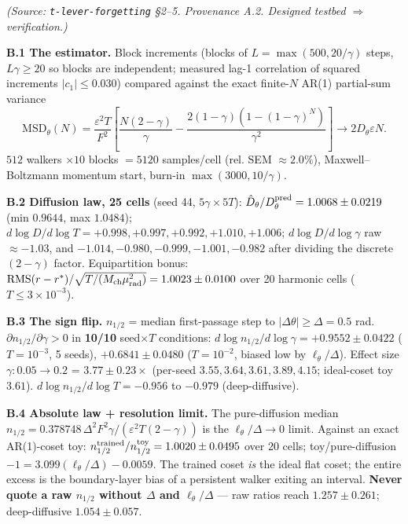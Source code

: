 \documentclass{article}
\begin{document}
\emph{(Source: \texttt{t-lever-forgetting} \S 2--5. Provenance A.2. Designed testbed $\Rightarrow$ verification.)}

\textbf{B.1 The estimator.} Block increments (blocks of $L=\max(500,20/\gamma)$ steps, $L\gamma\ge20$ so blocks are independent; measured lag-1 correlation of squared increments $|c_1|\le0.030$) compared against the exact finite-$N$ AR(1) partial-sum variance
\begin{equation*}
\mathrm{MSD}_\theta(N)=\frac{\varepsilon^2T}{F^2}\!\left[\frac{N(2-\gamma)}{\gamma}-\frac{2(1-\gamma)(1-(1-\gamma)^N)}{\gamma^2}\right]\to 2D_\theta\varepsilon N.
\end{equation*}
$512$ walkers $\times10$ blocks $=5120$ samples/cell (rel. SEM $\approx2.0\%$), Maxwell--Boltzmann momentum start, burn-in $\max(3000,10/\gamma)$.

\textbf{B.2 Diffusion law, 25 cells} (seed 44, $5\gamma\times5T$): $\hat D_\theta/D_\theta^{\rm pred}=1.0068\pm0.0219$ (min $0.9644$, max $1.0484$); $d\log D/d\log T=+0.998,+0.997,+0.992,+1.010,+1.006$; $d\log D/d\log\gamma$ raw $\approx-1.03$, and $-1.014,-0.980,-0.999,-1.001,-0.982$ after dividing the discrete $(2-\gamma)$ factor. Equipartition bonus: $\mathrm{RMS}(r-r^*)/\sqrt{T/(M_{\rm ch}\mu_{\rm rad}^2)}=1.0023\pm0.0100$ over 20 harmonic cells ($T\le3\times10^{-3}$).

\textbf{B.3 The sign flip.} $n_{1/2}$ = median first-passage step to $|\Delta\theta|\ge\Delta=0.5$ rad. $\partial n_{1/2}/\partial\gamma>0$ in \textbf{10/10} seed$\times T$ conditions: $d\log n_{1/2}/d\log\gamma=+0.9552\pm0.0422$ ($T=10^{-3}$, 5 seeds), $+0.6841\pm0.0480$ ($T=10^{-2}$, biased low by $\ell_\theta/\Delta$). Effect size $\gamma:0.05\to0.2$ = $3.77\pm0.23\times$ (per-seed $3.55,3.64,3.61,3.89,4.15$; ideal-coset toy $3.61$). $d\log n_{1/2}/d\log T=-0.956$ to $-0.979$ (deep-diffusive).

\textbf{B.4 Absolute law + resolution limit.} The pure-diffusion median $n_{1/2}=0.378748\,\Delta^2F^2\gamma/(\varepsilon^2T(2-\gamma))$ is the $\ell_\theta/\Delta\to0$ limit. Against an exact AR(1)-coset toy: $n_{1/2}^{\rm trained}/n_{1/2}^{\rm toy}=1.0020\pm0.0495$ over 20 cells; toy/pure-diffusion $-1=3.099(\ell_\theta/\Delta)-0.0059$. The trained coset \emph{is} the ideal flat coset; the entire excess is the boundary-layer bias of a persistent walker exiting an interval. \textbf{Never quote a raw $n_{1/2}$ without $\Delta$ and $\ell_\theta/\Delta$} --- raw ratios reach $1.257\pm0.261$; deep-diffusive $1.054\pm0.057$.
\end{document}
